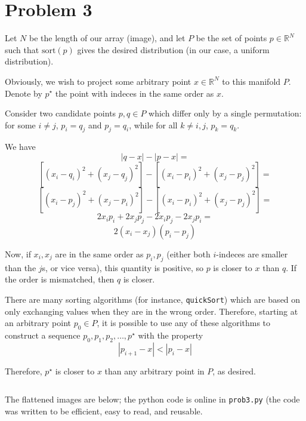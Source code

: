 \documentclass[psamsfonts]{amsart}
\theoremstyle{definition}
\theoremstyle{remark}
\numberwithin{equation}{section}
\begin{document}
\section{Problem 3}

Let $N$ be the length of our array (image), and let $P$ be the set of points $p \in \mathbb{R}^N$ such that 
$\text{sort}(p)$ gives the desired distribution (in our case, a uniform distribution).


Obviously, we wish to project some arbitrary point $x \in \mathbb{R}^N$ to this manifold $P$.
Denote by $p^{\star}$ the point with indeces in the same order as $x$.

Consider two candidate points $p, q \in P$ which differ only by a single permutation: 
for some $i \not= j$, $p_i = q_j$ and $p_j = q_i$, while for all $k \not= i, j$, $p_k = q_k$.

We have
\[
|q - x| - |p - x| = 
\]
\[
[(x_i - q_i)^2 + (x_j - q_j)^2] - [(x_i - p_i)^2 + (x_j - p_j)^2] = 
\]
\[
[(x_i - p_j)^2 + (x_j - p_i)^2] - [(x_i - p_i)^2 + (x_j - p_j)^2] = 
\]
\[
2x_ip_i + 2x_jp_j - 2x_ip_j - 2x_jp_i = 
\]
\[
2(x_i - x_j)(p_i - p_j)
\]

Now, if $x_i, x_j$ are in the same order as $p_i, p_j$ 
(either both $i$-indeces are smaller than the $j$s, or vice versa), 
this quantity is positive, so $p$ is closer to $x$ than $q$. If the order is mismatched, 
then $q$ is closer.

There are many sorting algorithms (for instance, \texttt{quickSort}) 
which are based on only exchanging values when they are in the wrong order. 
Therefore, starting at an arbitrary point $p_0 \in P$, it is possible 
to use any of these algorithms to construct a sequence $p_0, p_1, p_2, \ldots, p^{\star}$ with the property
\[
|p_{i + 1} - x| < |p_i - x|
\]

Therefore, $p^{\star}$ is closer to $x$ than any arbitrary point in $P$, as desired.

\[
\]

The flattened images are below; the python code is online in \texttt{prob3.py} 
(the code was written to be efficient, easy to read, and reusable.
\end{document}

